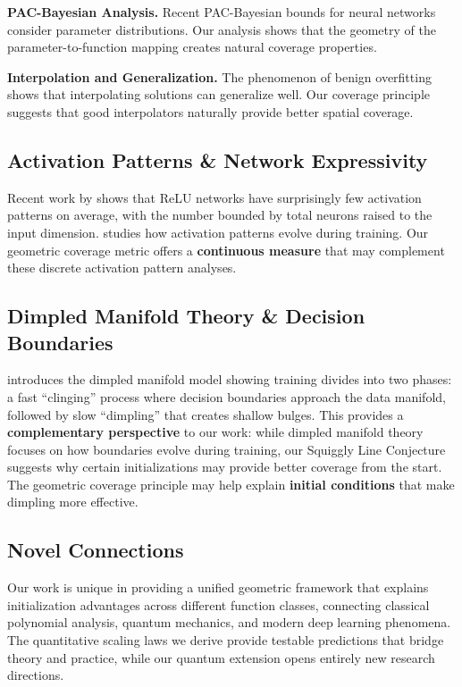 \textbf{PAC-Bayesian Analysis.} Recent PAC-Bayesian bounds for neural networks \cite{Neyshabur2017ExploringGI} consider parameter distributions. Our analysis shows that the geometry of the parameter-to-function mapping creates natural coverage properties.

\textbf{Interpolation and Generalization.} The phenomenon of benign overfitting \cite{Bartlett2019BenignOI} shows that interpolating solutions can generalize well. Our coverage principle suggests that good interpolators naturally provide better spatial coverage.

\subsection{Activation Patterns \& Network Expressivity}

Recent work by \cite{Hanin2019DeepRN} shows that ReLU networks have surprisingly few activation patterns on average, with the number bounded by total neurons raised to the input dimension. \cite{Hartmann2021StudyingEvolution} studies how activation patterns evolve during training. Our geometric coverage metric offers a \textbf{continuous measure} that may complement these discrete activation pattern analyses.

\subsection{Dimpled Manifold Theory \& Decision Boundaries}

\cite{Shamir2021TheDM} introduces the dimpled manifold model showing training divides into two phases: a fast ``clinging'' process where decision boundaries approach the data manifold, followed by slow ``dimpling'' that creates shallow bulges. This provides a \textbf{complementary perspective} to our work: while dimpled manifold theory focuses on how boundaries evolve during training, our Squiggly Line Conjecture suggests why certain initializations may provide better coverage from the start. The geometric coverage principle may help explain \textbf{initial conditions} that make dimpling more effective.

\subsection{Novel Connections}

Our work is unique in providing a unified geometric framework that explains initialization advantages across different function classes, connecting classical polynomial analysis, quantum mechanics, and modern deep learning phenomena. The quantitative scaling laws we derive provide testable predictions that bridge theory and practice, while our quantum extension opens entirely new research directions.